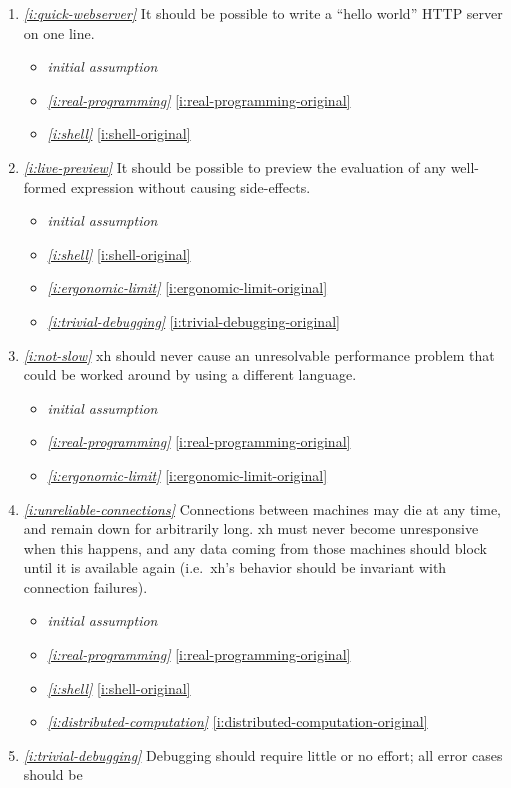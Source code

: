 \documentclass{report}
\makeatletter
\newcommand*{\Label}[2]{%
  \@bsphack
  \begingroup
    \label{#1-original}%
    \def\@currentlabel{#2}%
    \label{#1}%
  \endgroup
  \@esphack
}
\newcommand{\initial}{{\em initial assumption}}
\newcommand{\refboth}[1]{{\em \ref{#1}} \ref{#1-original}}
\makeatother
\begin{document}
\begin{enumerate}
\item{}\Label{i:quick-webserver}{webserver}{\em\ref{i:quick-webserver}}
  It should be possible to write a ``hello world'' HTTP server on one line.
\begin{itemize}
\item \initial
\item \refboth{i:real-programming}
\item \refboth{i:shell}
\end{itemize}
\item{}\Label{i:live-preview}{liveprev}{\em\ref{i:live-preview}}
  It should be possible to preview the evaluation of any well-formed
  expression without causing side-effects.
\begin{itemize}
\item \initial
\item \refboth{i:shell}
\item \refboth{i:ergonomic-limit}
\item \refboth{i:trivial-debugging}
\end{itemize}
\item{}\Label{i:not-slow}{notslow}{\em\ref{i:not-slow}}
  xh should never cause an unresolvable performance problem that could be
  worked around by using a different language.
\begin{itemize}
\item \initial
\item \refboth{i:real-programming}
\item \refboth{i:ergonomic-limit}
\end{itemize}
\item{}\Label{i:unreliable-connections}{unreliable}{\em\ref{i:unreliable-connections}}
  Connections between machines may die at any time, and remain down for
  arbitrarily long. xh must never become unresponsive when this happens,
  and any data coming from those machines should block until it is
  available again (i.e.~xh's behavior should be invariant with connection
  failures).
\begin{itemize}
\item \initial
\item \refboth{i:real-programming}
\item \refboth{i:shell}
\item \refboth{i:distributed-computation}
\end{itemize}
\item{}\Label{i:trivial-debugging}{nodebug}{\em\ref{i:trivial-debugging}}
  Debugging should require little or no effort; all error cases should be

\end{enumerate}
\end{document}

